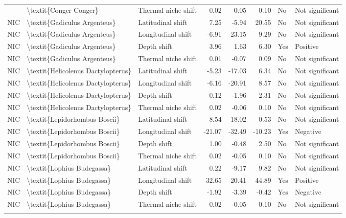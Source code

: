 \begin{longtable}[t]{lllrrrll}
{{NIC & \textbackslash{}textit\{Conger Conger\} & Thermal niche shift & 0.02 & -0.05 & 0.10 & No & Not significant\\
NIC & \textbackslash{}textit\{Gadiculus Argenteus\} & Latitudinal shift & 7.25 & -5.94 & 20.55 & No & Not significant\\
\addlinespace
NIC & \textbackslash{}textit\{Gadiculus Argenteus\} & Longitudinal shift & -6.91 & -23.15 & 9.29 & No & Not significant\\
NIC & \textbackslash{}textit\{Gadiculus Argenteus\} & Depth shift & 3.96 & 1.63 & 6.30 & Yes & Positive\\
NIC & \textbackslash{}textit\{Gadiculus Argenteus\} & Thermal niche shift & 0.01 & -0.07 & 0.09 & No & Not significant\\
NIC & \textbackslash{}textit\{Helicolenus Dactylopterus\} & Latitudinal shift & -5.23 & -17.03 & 6.34 & No & Not significant\\
NIC & \textbackslash{}textit\{Helicolenus Dactylopterus\} & Longitudinal shift & -6.16 & -20.91 & 8.57 & No & Not significant\\
\addlinespace
NIC & \textbackslash{}textit\{Helicolenus Dactylopterus\} & Depth shift & 0.12 & -1.96 & 2.31 & No & Not significant\\
NIC & \textbackslash{}textit\{Helicolenus Dactylopterus\} & Thermal niche shift & 0.02 & -0.06 & 0.10 & No & Not significant\\
NIC & \textbackslash{}textit\{Lepidorhombus Boscii\} & Latitudinal shift & -8.54 & -18.02 & 0.53 & No & Not significant\\
NIC & \textbackslash{}textit\{Lepidorhombus Boscii\} & Longitudinal shift & -21.07 & -32.49 & -10.23 & Yes & Negative\\
NIC & \textbackslash{}textit\{Lepidorhombus Boscii\} & Depth shift & 1.00 & -0.48 & 2.50 & No & Not significant\\
\addlinespace
NIC & \textbackslash{}textit\{Lepidorhombus Boscii\} & Thermal niche shift & 0.02 & -0.05 & 0.10 & No & Not significant\\
NIC & \textbackslash{}textit\{Lophius Budegassa\} & Latitudinal shift & 0.22 & -9.17 & 9.82 & No & Not significant\\
NIC & \textbackslash{}textit\{Lophius Budegassa\} & Longitudinal shift & 32.65 & 20.41 & 44.89 & Yes & Positive\\
NIC & \textbackslash{}textit\{Lophius Budegassa\} & Depth shift & -1.92 & -3.39 & -0.42 & Yes & Negative\\
NIC & \textbackslash{}textit\{Lophius Budegassa\} & Thermal niche shift & 0.02 & -0.05 & 0.10 & No & Not significant\\
}}
\end{longtable}
